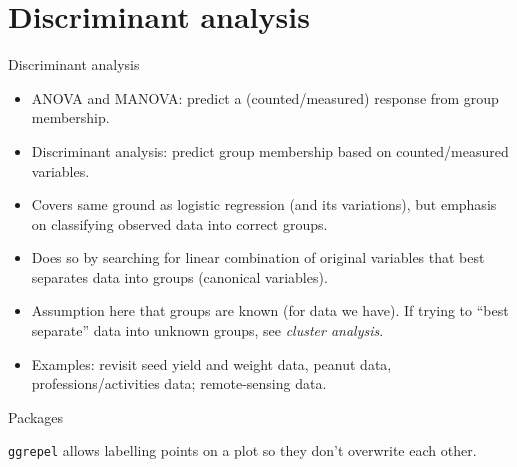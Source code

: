 \section{Discriminant analysis}
\frame{\sectionpage}



\begin{frame}[fragile]{Discriminant analysis}

  \begin{itemize}
  \item ANOVA and MANOVA: predict a (counted/measured) response from group membership.
  \item Discriminant analysis: predict group membership based on counted/measured variables.
  \item Covers same ground as logistic regression (and its variations), but emphasis on classifying observed data into correct groups.
  \item Does so by searching for linear combination of original variables that best separates data into groups (canonical variables).
  \item Assumption here that groups are known (for data we have). If trying to ``best separate'' data into unknown groups, see {\em cluster analysis}.
  \item Examples: revisit seed yield and weight data, peanut data,
    professions/activities data; remote-sensing data.
  \end{itemize}

\end{frame}


\begin{frame}[fragile]{Packages}
\begin{knitrout}
\color{fgcolor}\begin{kframe}
\begin{alltt}
\end{alltt}


{\ttfamily\noindent\itshape\color{messagecolor}{\#\# Loading tidyverse: ggplot2\\\#\# Loading tidyverse: tibble\\\#\# Loading tidyverse: tidyr\\\#\# Loading tidyverse: readr\\\#\# Loading tidyverse: purrr\\\#\# Loading tidyverse: dplyr}}

{\ttfamily\noindent\itshape\color{messagecolor}{\#\# Conflicts with tidy packages ----------------------------------------------}}

{\ttfamily\noindent\itshape\color{messagecolor}{\#\# filter(): dplyr, stats\\\#\# lag():\ \ \ \ dplyr, stats}}\begin{alltt}
\end{alltt}
\end{kframe}
\end{knitrout}

\texttt{ggrepel} allows labelling points on a plot so they don't
overwrite each other.
\end{frame}

